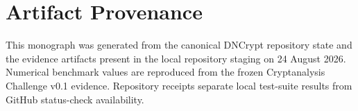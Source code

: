 \backmatter
\chapter*{Artifact Provenance}
This monograph was generated from the canonical DNCrypt repository state and the evidence artifacts present in the local repository staging on 24 August 2026. Numerical benchmark values are reproduced from the frozen Cryptanalysis Challenge v0.1 evidence. Repository receipts separate local test-suite results from GitHub status-check availability.


